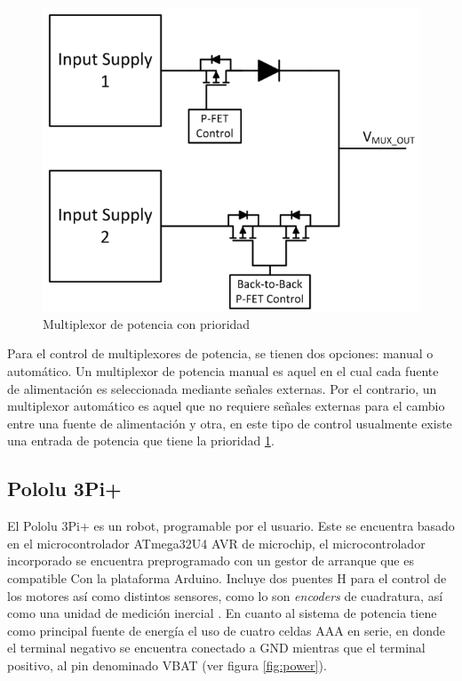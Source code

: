 \begin{figure}[H]
    \centering
    \includegraphics[scale=.5]{imagenes/priorityMUX.png}
    \caption{Multiplexor de potencia con prioridad \cite{triano_basics_2020}}
    \label{fig:priorityMux}
\end{figure}

Para el control de multiplexores de potencia, se tienen dos opciones: manual o automático. Un multiplexor de
potencia manual es aquel en el cual cada fuente de alimentación es seleccionada mediante señales externas. Por el contrario, un multiplexor automático es aquel que no requiere señales externas para el cambio entre 
una fuente de alimentación y otra, en este tipo de control usualmente existe una entrada de potencia que 
tiene la prioridad \ref{fig:priorityMux}.

\subsection*{Pololu 3Pi+}

El Pololu 3Pi+ es un robot, programable por el usuario. Este se encuentra basado en el microcontrolador ATmega32U4 AVR
de microchip, el microcontrolador incorporado se encuentra preprogramado con un gestor de arranque que es compatible
 Con la plataforma Arduino. Incluye dos puentes H para el control de los motores así como distintos sensores, como lo 
 son \textit{encoders} de cuadratura, así como una unidad de medición inercial \cite{noauthor_pololu_nodate}. En cuanto 
 al sistema de potencia tiene como principal fuente de energía el uso de cuatro celdas AAA en serie, en donde el 
 terminal negativo se encuentra conectado a GND mientras que el terminal positivo, al pin denominado VBAT (ver figura
 \ref{fig:power}).

